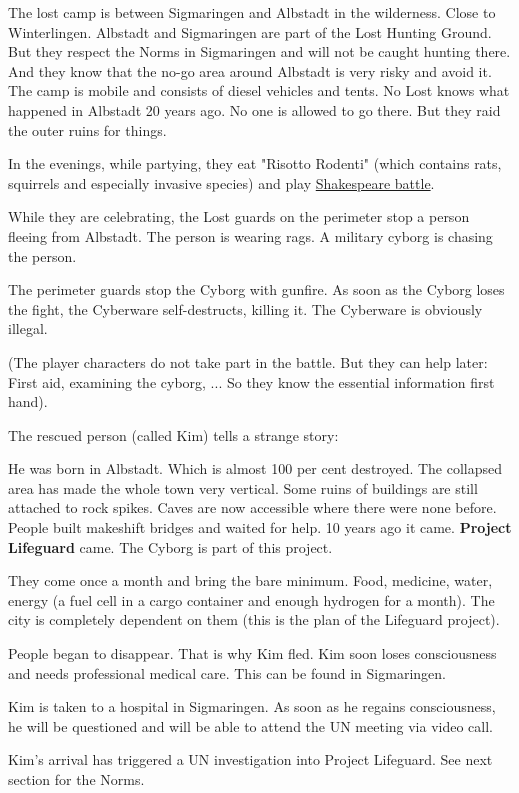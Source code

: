 The lost camp is between Sigmaringen and Albstadt in the wilderness. Close to Winterlingen. Albstadt and Sigmaringen are part of the Lost Hunting Ground. But they respect the Norms in Sigmaringen and will not be caught hunting there. And they know that the no-go area around Albstadt is very risky and avoid it. The camp is mobile and consists of diesel vehicles and tents. No Lost knows what happened in Albstadt 20 years ago. No one is allowed to go there. But they raid the outer ruins for things.

In the evenings, while partying, they eat "Risotto Rodenti" (which contains rats, squirrels and especially invasive species) and play \hyperref[sec:Shakespeare battle]{Shakespeare battle}.

While they are celebrating, the Lost guards on the perimeter stop a person fleeing from Albstadt. The person is wearing rags. A military cyborg is chasing the person.

The perimeter guards stop the Cyborg with gunfire. As soon as the Cyborg loses the fight, the Cyberware self-destructs, killing it. The Cyberware is obviously illegal.

(The player characters do not take part in the battle. But they can help later: First aid, examining the cyborg, ... So they know the essential information first hand).

The rescued person (called Kim) tells a strange story:

He was born in Albstadt. Which is almost 100 per cent destroyed. The collapsed area has made the whole town very vertical. Some ruins of buildings are still attached to rock spikes. Caves are now accessible where there were none before. People built makeshift bridges and waited for help. 10 years ago it came. \textbf{Project Lifeguard} came. The Cyborg is part of this project.

They come once a month and bring the bare minimum. Food, medicine, water, energy (a fuel cell in a cargo container and enough hydrogen for a month). The city is completely dependent on them (this is the plan of the Lifeguard project).

People began to disappear. That is why Kim fled. Kim soon loses consciousness and needs professional medical care. This can be found in Sigmaringen.

Kim is taken to a hospital in Sigmaringen. As soon as he regains consciousness, he will be questioned and will be able to attend the UN meeting via video call.

Kim's arrival has triggered a UN investigation into Project Lifeguard. See next section for the Norms.

